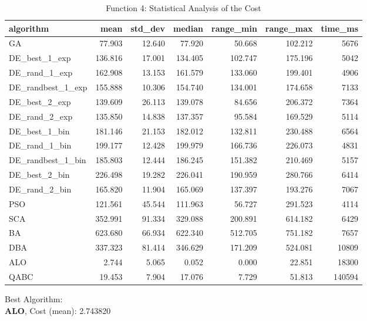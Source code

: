 \documentclass[12pt]{article}
\begin{document}
\begin{table}[H]
    \centering
    \footnotesize
    \begin{adjustbox}{width=1\textwidth}
\begin{tabular}{lrrrrrr}
\toprule
         algorithm &    mean &  std\_dev &  median &  range\_min &  range\_max &  time\_ms \\
\midrule
                GA &  77.903 &   12.640 &  77.920 &     50.668 &    102.212 &     5676 \\
     DE\_best\_1\_exp & 136.816 &   17.001 & 134.405 &    102.747 &    175.196 &     5042 \\
     DE\_rand\_1\_exp & 162.908 &   13.153 & 161.579 &    133.060 &    199.401 &     4906 \\
 DE\_randbest\_1\_exp & 155.888 &   10.306 & 154.740 &    134.001 &    174.658 &     7133 \\
     DE\_best\_2\_exp & 139.609 &   26.113 & 139.078 &     84.656 &    206.372 &     7364 \\
     DE\_rand\_2\_exp & 135.850 &   14.838 & 137.357 &     95.584 &    169.529 &     5114 \\
     DE\_best\_1\_bin & 181.146 &   21.153 & 182.012 &    132.811 &    230.488 &     6564 \\
     DE\_rand\_1\_bin & 199.177 &   12.428 & 199.979 &    166.736 &    226.073 &     4831 \\
 DE\_randbest\_1\_bin & 185.803 &   12.444 & 186.245 &    151.382 &    210.469 &     5157 \\
     DE\_best\_2\_bin & 226.498 &   19.282 & 226.041 &    190.959 &    280.766 &     6414 \\
     DE\_rand\_2\_bin & 165.820 &   11.904 & 165.069 &    137.397 &    193.276 &     7067 \\
               PSO & 121.561 &   45.544 & 111.963 &     56.727 &    291.523 &     4114 \\
               SCA & 352.991 &   91.334 & 329.088 &    200.891 &    614.182 &     6429 \\
                BA & 623.680 &   66.934 & 622.340 &    512.705 &    751.182 &     7657 \\
               DBA & 337.323 &   81.414 & 346.629 &    171.209 &    524.081 &    10809 \\
               ALO &   2.744 &    5.065 &   0.052 &      0.000 &     22.851 &    18300 \\
              QABC &  19.453 &    7.904 &  17.076 &      7.729 &     51.813 &   140594 \\
\bottomrule
\end{tabular}


    \end{adjustbox}
    \caption{Function 4: Statistical Analysis of the Cost} 
    \end{table}
Best Algorithm: \\
\textbf{ALO}, Cost (mean): 2.743820\\
\newpage
\end{document}
